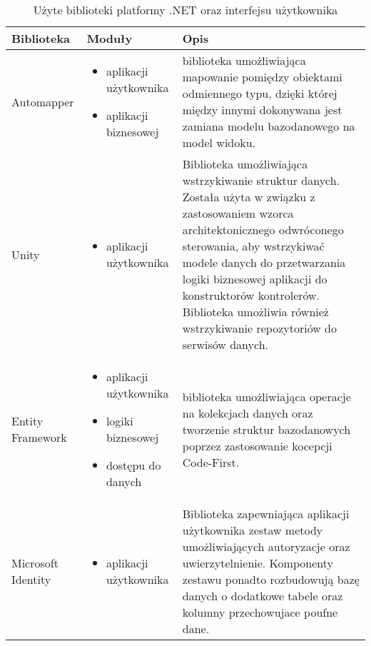 \begin{center}
    \begin{longtable}{ | p{2.2cm} | p{5cm} | p{6.5cm} |}
   	\caption{Użyte biblioteki platformy .NET oraz interfejsu użytkownika} \\
    \hline Biblioteka & Moduły & Opis \\ \hline    
    \hline Automapper &  
    	\begin{itemize} 
   			 \item aplikacji użytkownika
   			 \item aplikacji biznesowej	
   		\end{itemize} 
    & biblioteka umożliwiająca mapowanie pomiędzy obiektami odmiennego typu, dzięki której między innymi dokonywana jest zamiana modelu bazodanowego na model widoku.\\ \hline
    
    \hline Unity &	
    \begin{itemize} 
   			 \item aplikacji użytkownika
    \end{itemize}
   			 & Biblioteka umożliwiająca wstrzykiwanie struktur danych. Została użyta w związku z zastosowaniem wzorca architektonicznego odwróconego sterowania, aby wstrzykiwać modele danych do przetwarzania logiki biznesowej aplikacji do konstruktorów kontrolerów. Biblioteka umożliwia również wstrzykiwanie repozytoriów do serwisów danych.	\\ \hline
    
        \hline Entity \mbox{Framework} &  
    	\begin{itemize} 
   			  \item aplikacji użytkownika
 			  \item logiki biznesowej
			  \item dostępu do danych
   		\end{itemize} 
    &  biblioteka umożliwiająca operacje na kolekcjach danych oraz tworzenie struktur bazodanowych poprzez zastosowanie kocepcji Code-First.\\ \hline
    
        \hline Microsoft Identity & 
         \begin{itemize} 
   			 \item aplikacji użytkownika
    	\end{itemize} & Biblioteka zapewniająca aplikacji użytkownika zestaw metody umożliwiających autoryzacje oraz uwierzytelnienie. Komponenty zestawu ponadto rozbudowują bazę danych o dodatkowe tabele oraz kolumny przechowujace poufne dane. \\ \hline
    

\end{longtable}
\end{center}

